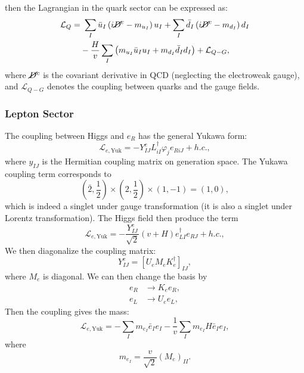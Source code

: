 then the Lagrangian in the quark sector can be expressed as:
\begin{equation}
\begin{aligned}
	\mathcal L_Q =&\ \sum_I \bar u_I\left(i\cancel D^c-m_{u_I}\right)u_I + \sum_I \bar d_I \left(i \cancel D^c-m_{d_I}\right)d_I \\
	& -\frac{H}{v} \sum_I\left(m_{u_I}\bar u_I u_I+m_{d_I}\bar d_I d_I \right) + \mathcal L_{Q-G},
\end{aligned}
\end{equation}
where $\cancel D^c$ is the covariant derivative in QCD (neglecting the electroweak gauge), and $\mathcal L_{Q-G}$ denotes the coupling between quarks and the gauge fields.

\subsubsection{Lepton Sector}
The coupling between Higgs and $e_R$ has the general Yukawa form:
\begin{equation}
	\mathcal L_{e,\mathrm{Yuk}} = -Y^e_{IJ} L_{iI}^\dagger \varphi_j e_{R iJ} + h.c.,
\end{equation}
where $y_{IJ}$ is the Hermitian coupling matrix on generation space.
The Yukawa coupling term corresponds to
\begin{equation}
	\left(\bar 2, \frac{1}{2}\right) \times \left(2, \frac{1}{2}\right) \times \left(1, -1\right) = \left(1,0\right),
\end{equation}
which is indeed a singlet under gauge transformation (it is also a singlet under Lorentz transformation).
The Higgs field then produce the term
\begin{equation}
	\mathcal L_{e,\mathrm{Yuk}} = -\frac{Y^e_{IJ}}{\sqrt 2}(v+H) e_{LI}^\dagger e_{RJ} + h.c.,
\end{equation}
We then diagonalize the coupling matrix:
\begin{equation}
	 Y^e_{IJ} = \left[U_{e} M_e K^\dagger_{e}\right]_{IJ},
\end{equation}
where $M_e$ is diagonal.
We can then change the basis by
\begin{equation}
\begin{aligned}
	e_R &\rightarrow K_e e_R, \\
	e_L &\rightarrow U_e e_L,
\end{aligned}
\end{equation}
Then the coupling gives the mass:
\begin{equation}
	\mathcal L_{e,\mathrm{Yuk}} 
	= - \sum_I m_{e_I} \bar e_I e_I - \frac{1}{v}\sum_I m_{e_I} H \bar e_I e_I,
\end{equation}
where
\begin{equation}
	m_{e_I} = \frac{v}{\sqrt 2} (M_e)_{II}.
\end{equation}

